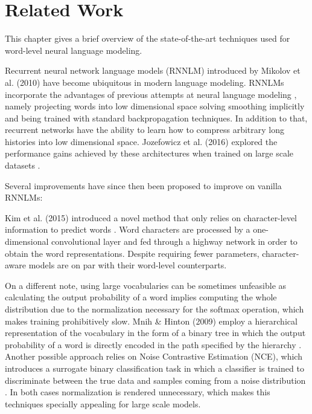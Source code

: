 \chapter{Related Work}

This chapter gives a brief overview of the state-of-the-art techniques used for word-level neural language modeling.

Recurrent neural network language models (RNNLM) \cite{mikolov2010recurrent} introduced by Mikolov et al. (2010) have become ubiquitous in modern language modeling. RNNLMs incorporate the advantages of previous attempts at neural language modeling \cite{bengio2003neural}, namely projecting words into low dimensional space solving smoothing implicitly and being trained with standard backpropagation techniques. In addition to that, recurrent networks have the ability to learn how to compress arbitrary long histories into low dimensional space. Jozefowicz et al. (2016) explored the performance gains achieved by these architectures when trained on large scale datasets \cite{jozefowicz2016exploring}.

Several improvements have since then been proposed to improve on vanilla RNNLMs:

Kim et al. (2015) introduced a novel method that only relies on character-level information to predict words \cite{kim2016character}. Word characters are processed by a one-dimensional convolutional layer and fed through a highway network in order to obtain the word representations. Despite requiring fewer parameters, character-aware models are on par with their word-level counterparts.

On a different note, using large vocabularies can be sometimes unfeasible as calculating the output probability of a word implies computing the whole distribution due to the normalization necessary for the softmax operation, which makes training prohibitively slow. Mnih \& Hinton (2009) employ a hierarchical representation of the vocabulary in the form of a binary tree in which the output probability of a word is directly encoded in the path specified by the hierarchy \cite{mnih2009scalable}. Another possible approach relies on Noise Contrastive Estimation (NCE), which introduces a surrogate binary classification task in which a classifier is trained to discriminate between the true data and samples coming from a noise distribution \cite{mnih2012fast}. In both cases normalization is rendered unnecessary, which makes this techniques specially appealing for large scale models.

